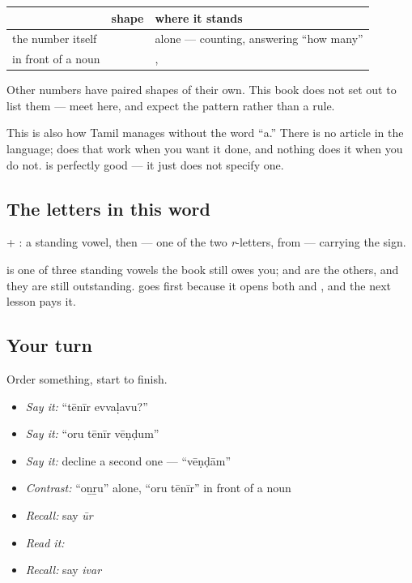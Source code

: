 \begin{grammarlens}[title={Grammar Lens: the counting form and the leaning form}]
\noindent
\begin{tabularx}{\linewidth}{@{}>{\raggedright\arraybackslash}X>{\raggedright\arraybackslash}X>{\raggedright\arraybackslash}X@{}}
\toprule
\textbf{} & \textbf{shape} & \textbf{where it stands} \\
\midrule
the number itself & \textbf{\ta{ஒன்று}} & alone — counting, answering \textquotedblleft{}how many\textquotedblright{} \\
in front of a noun & \textbf{\ta{ஒரு}} & \textbf{\ta{ஒரு} \ta{தேநீர்}}, \textbf{\ta{ஒரு} \ta{நாள்}} \\
\bottomrule
\end{tabularx}

Other numbers have paired shapes of their own. This book does not set out to list them — meet \textbf{} here, and expect the pattern rather than a rule.

This is also how Tamil manages without the word \textquotedblleft{}a.\textquotedblright{} There is no article in the language; \textbf{} does that work when you want it done, and nothing does it when you do not. \textbf{ } is perfectly good — it just does not specify one.
\end{grammarlens}

\subsection*{The letters in this word}
\textbf{} + \textbf{}: a standing vowel, then \textbf{} — one of the two \emph{r}-letters, from \textbf{} — carrying the \textbf{} sign.

\textbf{} is one of three standing vowels the book still owes you; \textbf{} and \textbf{} are the others, and they are still outstanding. \textbf{} goes first because it opens both \textbf{} and \textbf{}, and the next lesson pays it.

\subsection*{Your turn}
Order something, start to finish.

\begin{itemize}
\raggedright
  \item \emph{Say it:} \textquotedblleft{}tēnīr evvaḷavu?\textquotedblright{}
  \item \emph{Say it:} \textquotedblleft{}oru tēnīr vēṇḍum\textquotedblright{}
  \item \emph{Say it:} decline a second one — \textquotedblleft{}vēṇḍām\textquotedblright{}
  \item \emph{Contrast:} \textquotedblleft{}oṉṟu\textquotedblright{} alone, \textquotedblleft{}oru tēnīr\textquotedblright{} in front of a noun
  \item \emph{Recall:} say \emph{ūr}
  \item \emph{Read it:} \textbf{}
  \item \emph{Recall:} say \emph{ivar}
\end{itemize}

